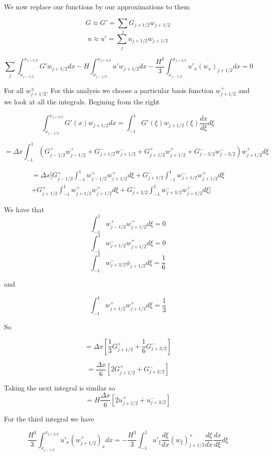 \documentclass[12pt]{article}
\begin{document}
We now replace our functions by our approximations to them

\[G \approx G' = \sum_{j}G_{j+1/2}w_{j+1/2}\]
\[u \approx u' = \sum_{j}u_{j+1/2}w_{j+1/2}\]

\[\sum_{j}\int_{x_{j-1/2}}^{x_{j+3/2}} G'w_{j+1/2} dx - H\int_{x_{j-1/2}}^{x_{j+3/2}} u'w_{j+1/2} dx -  \frac{H^3}{3}\int_{x_{j-1/2}}^{x_{j+3/2}}u'_{x}(w_{x})_{j+1/2}dx = 0 \]

For all $w_{j+1/2}^\pm$. For this analysis we choose a particular basis function $w^+_{j+1/2}$ and we look at all the integrals. Begining from the right

\[\int_{x_{j-1/2}}^{x_{j+3/2}} G'(x)w_{j+1/2} dx = \int_{-1}^{1} G'(\xi)w_{j+1/2}(\xi) \frac{d x}{d\xi}d\xi\]

\[= \Delta x \int_{-1}^{1} \left(G^+_{j- 1/2}w^+_{j - 1/2} + G^-_{j+ 1/2}w^-_{j + 1/2} + G^+_{j+ 1/2}w^+_{j + 1/2} + G^-_{j- 3/2}w^-_{j - 3/2}     \right)w^+_{j+1/2} d\xi\]

\begin{multline}
= \Delta x [G^+_{j- 1/2} \int_{-1}^{1} w^+_{j - 1/2}w^+_{j+1/2} d\xi + G^-_{j+ 1/2} \int_{-1}^{1} w^-_{j + 1/2}w^+_{j+1/2} d\xi  \\+ G^+_{j+ 1/2} \int_{-1}^{1} w^+_{j + 1/2}w^+_{j+1/2} d\xi + G^-_{j+ 3/2} \int_{-1}^{1} w^-_{j + 3/2}w^+_{j+1/2} d\xi ]
\end{multline}


We have that
\[\int_{-1}^{1} w^+_{j - 1/2}w^+_{j+1/2} d\xi = 0\]
\[\int_{-1}^{1} w^-_{j + 1/2}w^+_{j+1/2} d\xi = 0\]
\[\int_{-1}^{1} w^-_{j + 3/2}\phi_{j+1/2} d\xi  = \frac{1}{6} \]

and 

\[\int_{-1}^{1} w^+_{j + 1/2}w^+_{j + 1/2} d\xi = \frac{1}{3} \]

So

\[= \Delta x \left[\frac{1}{3}G^+_{j+ 1/2}  +  \frac{1}{6}G^-_{j+ 3/2}\right]\]

\[= \frac{\Delta x}{6}  \left[2G^+_{j+ 1/2}  +  G^-_{j+ 3/2}\right]\]

 Taking the next integral is similar so
\[= H\frac{\Delta x}{6}  \left[2u^+_{j+ 1/2}  +  u^-_{j+ 3/2}\right]\]

For the third integral we have 

\[\frac{H^3}{3}\int_{x_{j-1/2}}^{x_{j+3/2}}u'_{x}(w^+_{j+1/2})_{x}dx = -\frac{H^3}{3}\int_{-1}^{1}u'_{\xi}\frac{d \xi }{dx}(w_{\xi})^+_{j+1/2}\frac{d \xi }{dx} \frac{d x}{d\xi} d\xi   \]
\end{document}
